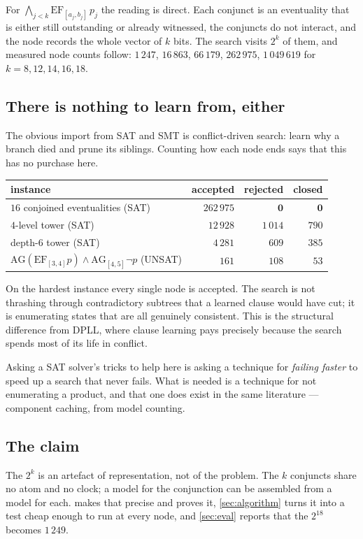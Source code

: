 For $\bigwedge_{j<k}\mathrm{EF}_{[a_j,b_j]}\,p_j$ the reading is direct. Each
conjunct is an eventuality that is either still outstanding or already
witnessed, the conjuncts do not interact, and the node records the whole
vector of $k$ bits. The search visits $2^k$ of them, and measured node counts
follow: $1\,247$, $16\,863$, $66\,179$, $262\,975$, $1\,049\,619$ for
$k = 8,12,14,16,18$.

\subsection{There is nothing to learn from, either}

The obvious import from SAT and SMT is conflict-driven search: learn why a
branch died and prune its siblings. Counting how each node ends says that this
has no purchase here.

\begin{center}\small
\begin{tabular}{@{}lrrr@{}}
\toprule
instance & accepted & rejected & closed \\
\midrule
$16$ conjoined eventualities (SAT) & $262\,975$ & $\mathbf{0}$ & $\mathbf{0}$ \\
$4$-level tower (SAT)               & $12\,928$  & $1\,014$ & $790$ \\
depth-$6$ tower (SAT)               & $4\,281$   & $609$   & $385$ \\
$\mathrm{AG}(\mathrm{EF}_{[3,4]}p)\wedge\mathrm{AG}_{[4,5]}\neg p$ (UNSAT)
                                    & $161$      & $108$   & $53$ \\
\bottomrule
\end{tabular}
\end{center}

On the hardest instance every single node is accepted. The search is not
thrashing through contradictory subtrees that a learned clause would have cut;
it is enumerating states that are all genuinely consistent. This is the
structural difference from DPLL, where clause learning pays precisely because
the search spends most of its life in conflict.

\begin{intuition}
Asking a SAT solver's tricks to help here is asking a technique for
\emph{failing faster} to speed up a search that never fails. What is needed is
a technique for not enumerating a product, and that one does exist in the same
literature --- component caching, from model counting.
\end{intuition}

\subsection{The claim}

The $2^k$ is an artefact of representation, not of the problem. The $k$
conjuncts share no atom and no clock; a model for the conjunction can be
assembled from a model for each.  makes that precise and
proves it, \cref{sec:algorithm} turns it into a test cheap enough to run at
every node, and \cref{sec:eval} reports that the $2^{18}$ becomes $1\,249$.
